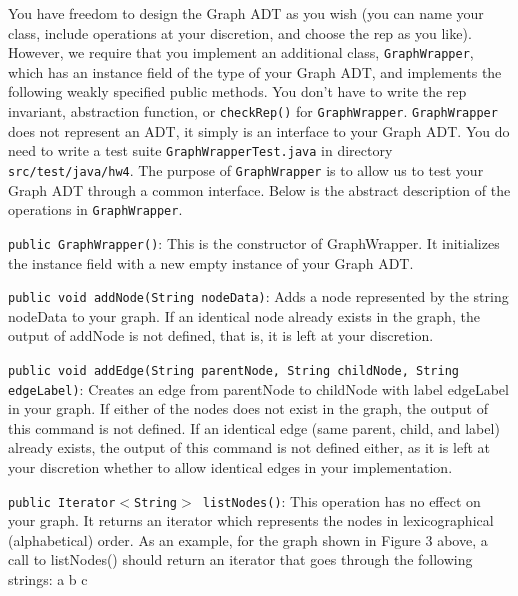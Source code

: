 \documentclass[11pt]{article}
\begin{document}
\noindent You have freedom to design the Graph ADT as you wish (you can name your class, include operations at your discretion, and choose the rep as you like). However, we require that you implement an additional class, \texttt{GraphWrapper}, which has an instance field of the type of your Graph ADT, and implements the following weakly specified public methods. You don't have to write the rep invariant, abstraction function, or \texttt{checkRep()} for \texttt{GraphWrapper}. \texttt{GraphWrapper} does not represent an ADT, it simply is an interface to your Graph ADT. You do need to write a test suite \texttt{GraphWrapperTest.java} in directory 
\texttt{src/test/java/hw4}. The purpose of \texttt{GraphWrapper} is to allow us to test your Graph ADT through a common interface. Below is the abstract description of the operations in \texttt{GraphWrapper}.

\newpage

\noindent \texttt{public GraphWrapper()}: This is the constructor of GraphWrapper. It initializes the instance field with a new empty instance of your Graph ADT.

\noindent \texttt{public void addNode(String nodeData)}: Adds a node represented by the string nodeData to your graph. If an identical node already exists in the graph, the output of addNode is not defined, that is, it is left at your discretion.

\noindent \texttt{public void addEdge(String parentNode, String childNode, String edgeLabel)}: Creates an edge from parentNode to childNode with label edgeLabel in your graph. If either of the nodes does not exist in the graph, the output of this command is not defined. If an identical edge (same parent, child, and label) already exists, the output of this command is not defined either, as it is left at your discretion whether to allow identical edges in your implementation.

\noindent \texttt{public Iterator$<$String$>$ listNodes()}: This operation has no effect on your graph. It returns an iterator which represents the nodes in lexicographical (alphabetical) order.
As an example, for the graph shown in Figure 3 above, a call to listNodes() should return an iterator that goes through the following strings:
\newline
a
\newline
b
\newline
c
\end{document}
